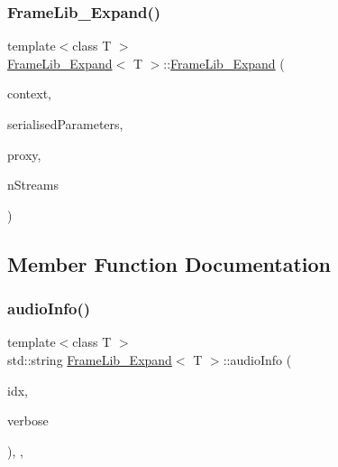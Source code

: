 \subsubsection{\texorpdfstring{Frame\+Lib\+\_\+\+Expand()}{FrameLib\_Expand()}}
{\footnotesize\ttfamily template$<$class T $>$ \\
\hyperlink{class_frame_lib___expand}{Frame\+Lib\+\_\+\+Expand}$<$ T $>$\+::\hyperlink{class_frame_lib___expand}{Frame\+Lib\+\_\+\+Expand} (\begin{DoxyParamCaption}\item[{\hyperlink{class_frame_lib___context}{Frame\+Lib\+\_\+\+Context}}]{context,  }\item[{\hyperlink{class_frame_lib___parameters_1_1_serial}{Frame\+Lib\+\_\+\+Parameters\+::\+Serial} $\ast$}]{serialised\+Parameters,  }\item[{\hyperlink{struct_frame_lib___proxy}{Frame\+Lib\+\_\+\+Proxy} $\ast$}]{proxy,  }\item[{unsigned long}]{n\+Streams }\end{DoxyParamCaption})\hspace{0.3cm}{\ttfamily [inline]}}



\subsection{Member Function Documentation}
\mbox{\label{class_frame_lib___expand_ab55544cf81d2ea1c9b53db6124eddc88}} 
\subsubsection{\texorpdfstring{audio\+Info()}{audioInfo()}}
{\footnotesize\ttfamily template$<$class T $>$ \\
std\+::string \hyperlink{class_frame_lib___expand}{Frame\+Lib\+\_\+\+Expand}$<$ T $>$\+::audio\+Info (\begin{DoxyParamCaption}\item[{unsigned long}]{idx,  }\item[{bool}]{verbose }\end{DoxyParamCaption})\hspace{0.3cm}{\ttfamily [inline]}, {\ttfamily [override]}, {\ttfamily [virtual]}}



